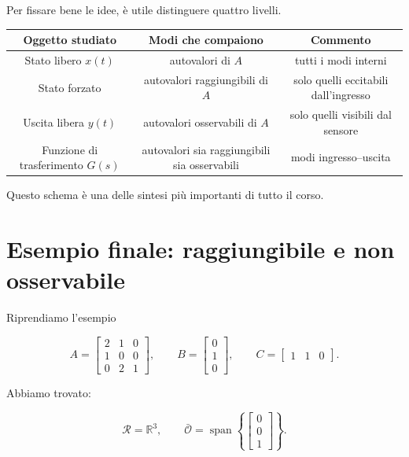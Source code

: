 Per fissare bene le idee, è utile distinguere quattro livelli.

\begin{center}
\renewcommand{\arraystretch}{1.4}
\begin{tabular}{|c|c|c|}
\hline
\textbf{Oggetto studiato} & \textbf{Modi che compaiono} & \textbf{Commento} \\
\hline
Stato libero \(x(t)\) & autovalori di \(A\) & tutti i modi interni \\
\hline
Stato forzato & autovalori raggiungibili di \(A\) & solo quelli eccitabili dall'ingresso \\
\hline
Uscita libera \(y(t)\) & autovalori osservabili di \(A\) & solo quelli visibili dal sensore \\
\hline
Funzione di trasferimento \(G(s)\) & autovalori sia raggiungibili sia osservabili & modi ingresso--uscita \\
\hline
\end{tabular}
\end{center}

\medskip

Questo schema è una delle sintesi più importanti di tutto il corso.

\bigskip

\section{Esempio finale: raggiungibile e non osservabile}

Riprendiamo l'esempio

\[
A=
\begin{bmatrix}
2 & 1 & 0\\
1 & 0 & 0\\
0 & 2 & 1
\end{bmatrix},
\qquad
B=
\begin{bmatrix}
0\\1\\0
\end{bmatrix},
\qquad
C=
\begin{bmatrix}
1 & 1 & 0
\end{bmatrix}.
\]

Abbiamo trovato:

\[
\mathcal R=\mathbb R^3,
\qquad
\bar{\mathcal O}
=
\operatorname{span}\left\{
\begin{bmatrix}
0\\0\\1
\end{bmatrix}
\right\}.
\]

